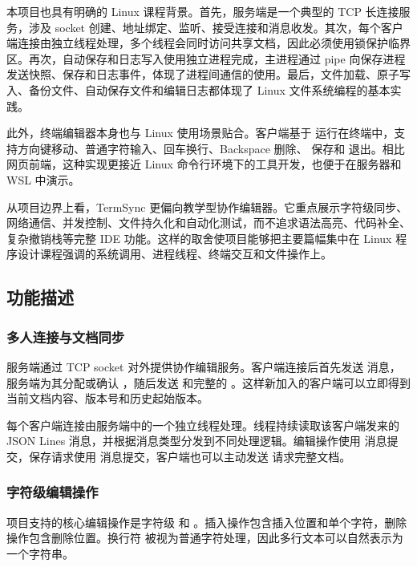 本项目也具有明确的 Linux 课程背景。首先，服务端是一个典型的 TCP 长连接服务，涉及 socket 创建、地址绑定、监听、接受连接和消息收发。其次，每个客户端连接由独立线程处理，多个线程会同时访问共享文档，因此必须使用锁保护临界区。再次，自动保存和日志写入使用独立进程完成，主进程通过 pipe 向保存进程发送快照、保存和日志事件，体现了进程间通信的使用。最后，文件加载、原子写入、备份文件、自动保存文件和编辑日志都体现了 Linux 文件系统编程的基本实践。

此外，终端编辑器本身也与 Linux 使用场景贴合。客户端基于  运行在终端中，支持方向键移动、普通字符输入、回车换行、Backspace 删除、 保存和  退出。相比网页前端，这种实现更接近 Linux 命令行环境下的工具开发，也便于在服务器和 WSL 中演示。

从项目边界上看，TermSync 更偏向教学型协作编辑器。它重点展示字符级同步、网络通信、并发控制、文件持久化和自动化测试，而不追求语法高亮、代码补全、复杂撤销栈等完整 IDE 功能。这样的取舍使项目能够把主要篇幅集中在 Linux 程序设计课程强调的系统调用、进程线程、终端交互和文件操作上。

\newpage
\subsection{功能描述}

\subsubsection{多人连接与文档同步}

服务端通过 TCP socket 对外提供协作编辑服务。客户端连接后首先发送  消息，服务端为其分配或确认 ，随后发送  和完整的 。这样新加入的客户端可以立即得到当前文档内容、版本号和历史起始版本。

每个客户端连接由服务端中的一个独立线程处理。线程持续读取该客户端发来的 JSON Lines 消息，并根据消息类型分发到不同处理逻辑。编辑操作使用  消息提交，保存请求使用  消息提交，客户端也可以主动发送  请求完整文档。

\subsubsection{字符级编辑操作}

项目支持的核心编辑操作是字符级  和 。插入操作包含插入位置和单个字符，删除操作包含删除位置。换行符  被视为普通字符处理，因此多行文本可以自然表示为一个字符串。

